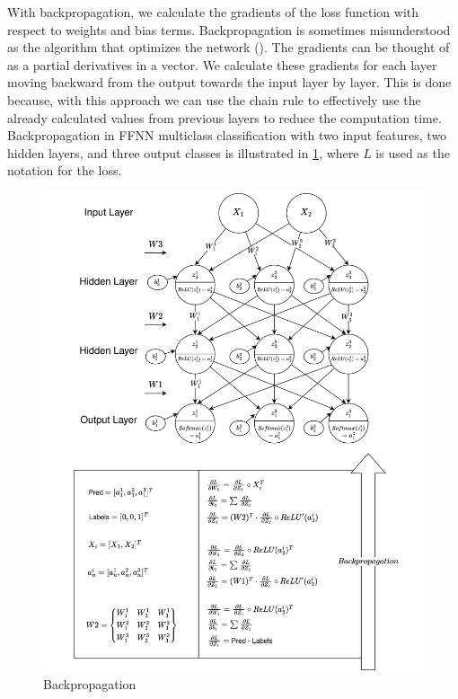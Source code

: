 With backpropagation, we calculate the gradients of the loss function with respect to weights and bias terms. Backpropagation is sometimes misunderstood as the algorithm that optimizes the network (\cite{Goodfellow-et-al-2016}). The gradients can be thought of as a partial derivatives in a vector. We calculate these gradients for each layer moving backward from the output towards the input layer by layer. This is done because, with this approach we can use the chain rule to effectively use the already calculated values from previous layers to reduce the computation time. Backpropagation in FFNN multiclass classification with two input features, two hidden layers, and three output classes is illustrated in \ref{fig:backprop}, where \(L\) is used as the notation for the loss.

\begin{figure}
    \centering
    \includegraphics[width=1\linewidth]{template//figures/backpropfigVersionFinal1(1).png}
    \caption{Backpropagation}
    \label{fig:backprop}
\end{figure}

